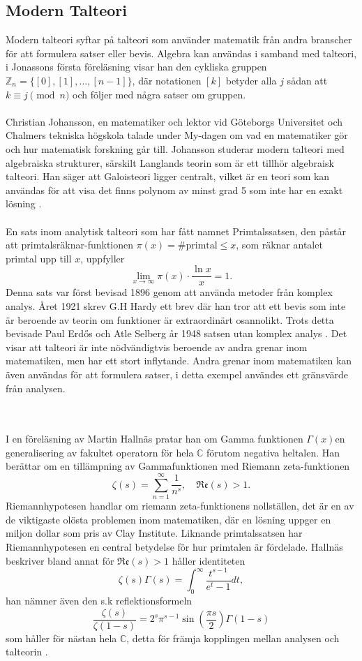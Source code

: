 \subsection*{Modern Talteori}
\iftrue
Modern talteori syftar på talteori som använder matematik från andra branscher för att formulera satser eller bevis. Algebra kan användas i samband med talteori, i Jonassons första föreläsning visar han den cykliska gruppen $\mathbb{Z}_n=\{[0],[1],\ldots,[n-1]\}$, där notationen $[k]$ betyder alla $j$ sådan att $k\equiv j \pmod n$ och följer med några satser om gruppen.
\\\\
Christian Johansson, en matematiker och lektor vid Göteborgs Universitet och Chalmers tekniska högskola talade under My-dagen om vad en matematiker gör och hur matematisk forskning går till. Johansson studerar modern talteori med algebraiska strukturer, särskilt Langlands teorin som är ett tillhör algebraisk talteori. Han säger att Galoisteori ligger centralt, vilket är en teori som kan användas för att visa det finns polynom av minst grad 5 som inte har en exakt lösning \cite{johansson}.
\\\\
En sats inom analytisk talteori som har fått namnet Primtalssatsen, den påstår att primtalsräknar-funktionen $\pi(x)= \text{\# primtal} \leq x$, som räknar antalet primtal upp till $x$, uppfyller $$\lim_{x\to \infty}\pi(x) \cdot \frac{\ln x}{x}=1.$$
Denna sats var först bevisad 1896 genom att använda metoder från komplex analys. Året 1921 skrev G.H Hardy ett brev där han tror att ett bevis som inte är beroende av teorin om funktioner är extraordinärt osannolikt. Trots detta bevisade Paul Erdős och Atle Selberg år 1948 satsen utan komplex analys \cite{Goldfeld2004, numbertheory:analytic}. Det visar att talteori är inte nödvändigtvis beroende av andra grenar inom matematiken, men har ett stort inflytande. Andra grenar inom matematiken kan även användas för att formulera satser, i detta exempel användes ett gränsvärde från analysen.
\fi
\\\\
I en föreläsning av Martin Hallnäs pratar han om Gamma funktionen $\Gamma(x)$\textemdash en generalisering av fakultet operatorn för hela $\mathbb{C}$ förutom negativa heltalen. Han berättar om en tillämpning av Gammafunktionen med Riemann zeta-funktionen
$$\zeta(s)=\sum_{n=1}^\infty\frac{1}{n^s}, \quad \mathfrak{Re}(s)>1.$$
Riemannhypotesen handlar om riemann zeta-funktionens nollställen, det är en av de viktigaste olösta problemen inom matematiken, där en lösning uppger en miljon dollar som pris av Clay Institute. Liknande primtalssatsen har Riemannhypotesen en central betydelse för hur primtalen är fördelade.
Hallnäs beskriver bland annat för $\mathfrak{Re}(s)>1$ håller identiteten
$$\zeta(s)\Gamma(s)=\int_0^\infty\frac{t^{s-1}}{e^t-1}dt,$$
han nämner även den s.k reflektionsformeln
$$\frac{\zeta(s)}{\zeta(1-s)}=2^s \pi^{s-1}\sin{\left(\frac{\pi s}{2}\right)}\Gamma(1-s)$$
som håller för nästan hela $\mathbb{C}$, 
detta för främja kopplingen mellan analysen och talteorin \cite{hallnas}.



